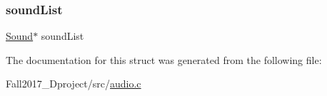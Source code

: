 \subsubsection{\texorpdfstring{sound\+List}{soundList}}
{\footnotesize\ttfamily \hyperlink{audio_8h_aa9272c2e4e238417673f542719f44a32}{Sound}$\ast$ sound\+List}



The documentation for this struct was generated from the following file\+:\begin{DoxyCompactItemize}
\item 
Fall2017\+\_\+Dproject/src/\hyperlink{audio_8c}{audio.\+c}\end{DoxyCompactItemize}
